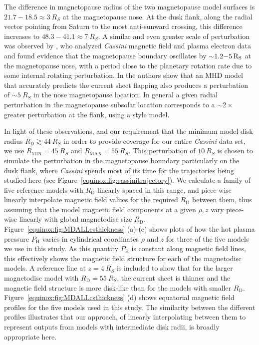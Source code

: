 The difference in magnetopause radius of the two magnetopause model surfaces is $21.7-18.5 \approx\SI{3}{R_S}$ at the magnetopause nose. At the dusk flank, along the radial vector pointing from Saturn to the most anti-sunward crossing, this difference increases to $48.3-41.1\approx\SI{7}{R_S}$. A similar and even greater scale of perturbation was observed by \citet{clarke2010}, who analyzed \textit{Cassini} magnetic field and plasma electron data and found evidence that the magnetopause boundary oscillates by ${\sim}1.2{\--}\SI{5}{R_S}$ at the magnetopause nose, with a period close to the planetary rotation rate due to some internal rotating perturbation. In \citet{kivelson2014} the authors show that an MHD model that accurately predicts the current sheet flapping also produces a perturbation of ${\sim}\SI{5}{R_S}$ in the nose magnetopause location. In general a given radial perturbation in the magnetopause subsolar location corresponds to a ${\sim}2\times$ greater perturbation at the flank, using a \citet{pilkington2015} style model.

In light of these observations, and our requirement that the minimum model disk radius $R_\mathrm{D} \gtrsim \SI{44}{R_S}$ in order to provide coverage for our entire \textit{Cassini} data set, we use $R_\mathrm{MIN} = \SI{45}{R_S}$ and $R_\mathrm{MAX}=\SI{55}{R_S}$. This perturbation of $\SI{10}{R_S}$ is chosen to simulate the perturbation in the magnetopause boundary particularly on the dusk flank, where \textit{Cassini} spends most of its time for the trajectories being studied here (see Figure~\ref{equinox:fig:cassinitrajectory}). We calculate a family of five reference models with $R_\mathrm{D}$ linearly spaced in this range, and piece-wise linearly interpolate magnetic field values for the required $R_\mathrm{D}$ between them, thus assuming that the model magnetic field components at a given $\rho,z$ vary piece-wise linearly with global magnetodisc size $R_\mathrm{D}$. Figure~\ref{equinox:fig:MDALLcsthickness} (a)-(c) shows plots of how the hot plasma pressure $P_\mathrm{H}$ varies in cylindrical coordinates $\rho$ and $z$ for three of the five models we use in this study. As this quantity $P_\mathrm{H}$ is constant along magnetic field lines, this effectively shows the magnetic field structure for each of the magnetodisc models. A reference line at $z=\SI{4}{R_S}$ is included to show that for the larger magnetodisc model with $R_\mathrm{D}=\SI{55}{R_S}$, the current sheet is thinner and the magnetic field structure is more disk-like than for the models with smaller $R_\mathrm{D}$. Figure~\ref{equinox:fig:MDALLcsthickness} (d) shows equatorial magnetic field profiles for the five models used in this study. The similarity between the different profiles illustrates that our approach, of linearly interpolating between them to represent outputs from models with intermediate disk radii, is broadly appropriate here.

